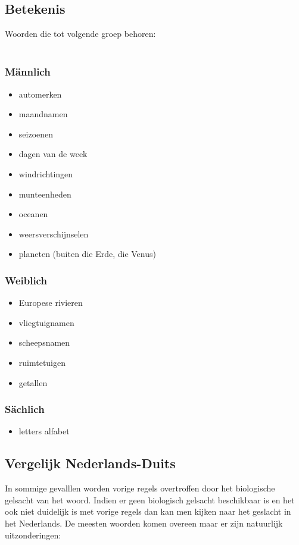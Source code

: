 \documentclass[main.tex]{subfiles}
\begin{document}
\subsection{Betekenis}
Woorden die tot volgende groep behoren:\\
\\
\begin{minipage}[t]{0,33\textwidth}
 \subsubsection{Männlich}
 \begin{itemize}
 \item automerken
 \item maandnamen
 \item seizoenen
 \item dagen van de week
 \item windrichtingen
 \item munteenheden
 \item oceanen	
 \item weersverschijnselen
 \item planeten (buiten die Erde, die Venus)
 \end{itemize}
\end{minipage}
\begin{minipage}[t]{0,33\textwidth}
 \subsubsection{Weiblich}
 \begin{itemize}
 \item Europese rivieren
 \item vliegtuignamen
 \item scheepsnamen
 \item ruimtetuigen
 \item getallen
 \end{itemize}
\end{minipage}
\begin{minipage}[t]{0,34\textwidth}
 \subsubsection{Sächlich}
 \begin{itemize}
 \item letters alfabet
 \end{itemize}
\end{minipage}
\subsection{Vergelijk Nederlands-Duits}
In sommige gevalllen worden vorige regels overtroffen door het biologische gelsacht van het woord. Indien er geen biologisch gelsacht beschikbaar is en het ook niet duidelijk is met vorige regels dan kan men kijken naar het geslacht in het Nederlands. De meesten woorden komen overeen maar er zijn natuurlijk uitzonderingen:\\
\end{document}
